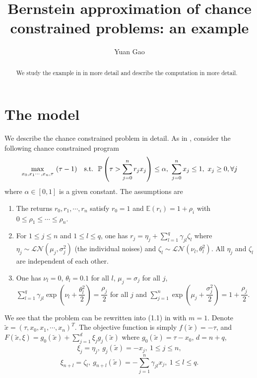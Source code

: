\documentclass[11pt]{article}
\title{Bernstein approximation of chance constrained problems: an example}
\author{Yuan Gao}
\begin{document}
\maketitle

\begin{abstract}
We study the example in\cite{Nemirovsky_and_Shapiro} in more detail and describe the computation in more detail.
\end{abstract}

\section*{The model}
We describe the chance constrained problem in detail. As in \cite{Nemirovsky_and_Shapiro}, consider the following chance constrained program
\begin{align} \label{investment_problem}
\max_{x_0, x_1\cdots,x_n, \tau}\ (\tau - 1)\ \ \ \textnormal{s.t.}\ \ \mathbb{P} \left(\tau > \sum_{j=0}^n r_j x_j \right) \leq \alpha,\ \sum_{j=0}^{n} x_j \leq 1,\ x_j \geq 0, \forall j
\end{align}
where $\alpha \in [0,1]$ is a given constant. The assumptions are 
\begin{enumerate}
	\item The returns $r_0, r_1, \cdots, r_n$ satisfy $r_0=1$ and $\mathbb{E}(r_i) = 1 + \rho_i$ with $0\leq \rho_1 \leq \cdots \leq \rho_n$.
	\item For $1\leq j \leq n$ and $1\leq l \leq q$, one has $r_j = \eta_j + \sum_{l=1}^q \gamma_{jl}\zeta_l$ where $\eta_j \sim \mathcal{LN}(\mu_j, \sigma_j^2)$ (the individual noises) and $\zeta_l \sim \mathcal{LN}(\nu_l, \theta_l^2)$. All $\eta_j$ and $\zeta_l$ are independent of each other.
	\item One has $\nu_l = 0$, $\theta_l=0.1$ for all $l$, $\mu_j = \sigma_j$ for all $j$, $\sum_{l=1}^q \gamma_{jl} \exp \left(\nu_l + \dfrac{\theta_l^2}{2}\right) = \dfrac{\rho_j}{2}$ for all $j$ and $\sum_{j=1}^n \exp\left(\mu_j + \dfrac{\sigma_j^2}{2}\right) = 1 + \dfrac{\rho_j}{2}$.
\end{enumerate}
We see that the problem can be rewritten into (1.1) in \cite{Nemirovsky_and_Shapiro} with $m=1$. Denote $\tilde{x} = (\tau, x_0, x_1, \cdots, x_n)^T$. The objective function is simply $f(\tilde{x}) = -\tau$, and $F(\tilde{x},\xi) =g_0(\tilde{x}) + \sum_{j=1}^d \xi_j g_j(\tilde{x})$ where $g_0(\tilde{x}) = \tau - x_0$,  $d = n+q$,
\[\xi_j = \eta_j,\ g_j(\tilde{x}) = -x_j,\ 1\leq j \leq n,\] \[\xi_{n+l} = \zeta_l,\ g_{n+l}(\tilde{x}) = -\sum_{j=1}^n \gamma_{jl}x_j,\ 1\leq l \leq q.\]
\end{document}
